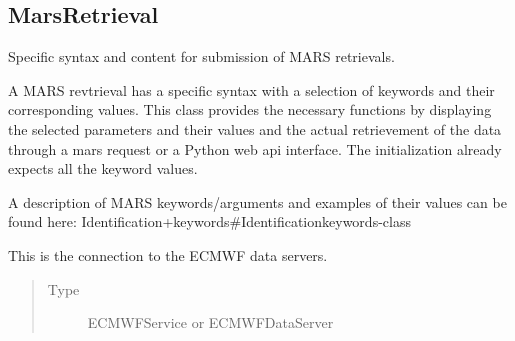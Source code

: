 \documentclass[letterpaper,10pt,english]{sphinxmanual}
\begin{document}
\subsection{MarsRetrieval}
\label{\detokenize{api:module-MarsRetrieval}}\label{\detokenize{api:marsretrieval}}

\begin{fulllineitems}
\label{\detokenize{api:MarsRetrieval.MarsRetrieval}}
Specific syntax and content for submission of MARS retrievals.

A MARS revtrieval has a specific syntax with a selection of keywords and
their corresponding values. This class provides the necessary functions
by displaying the selected parameters and their values and the actual
retrievement of the data through a mars request or a Python web api
interface. The initialization already expects all the keyword values.

A description of MARS keywords/arguments and examples of their
values can be found here:
                   Identification+keywords\#Identificationkeywords-class

\begin{fulllineitems}
\label{\detokenize{api:MarsRetrieval.MarsRetrieval.server}}
This is the connection to the ECMWF data servers.
\begin{quote}\begin{description}
\item[{Type}] \leavevmode
ECMWFService or ECMWFDataServer

\end{description}\end{quote}


\end{fulllineitems}
\end{fulllineitems}
\end{document}
